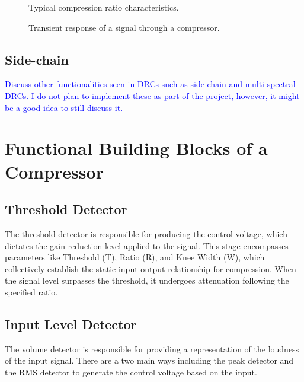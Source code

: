 \documentclass[10pt]{article}
\begin{document}
\begin{multicols*}{2}
            \begin{figure*}[ht]
                \centering
                \begin{minipage}{0.5\linewidth}
                    \centering
                    
                    \caption{Typical compression ratio characteristics.}
                    \label{fig:comp-ratio}
                \end{minipage}\hfill
                \begin{minipage}{0.5\linewidth}
                    \centering
                    
                    \caption{Transient response of a signal through a compressor.}
                    \label{fig:comp-trans}
                \end{minipage}\hfill
            \end{figure*}

            \subsection{Side-chain}
                \textcolor{blue}{Discuss other functionalities seen in DRCs such as side-chain and multi-spectral DRCs. I do not plan to implement these as part of the project, however, it might be a good idea to still discuss it.}

        \section{Functional Building Blocks of a Compressor}

            \subsection{Threshold Detector}
                The threshold detector is responsible for producing the control voltage, which dictates the gain reduction level applied to the signal. This stage encompasses parameters like Threshold (T), Ratio (R), and Knee Width (W), which collectively establish the static input-output relationship for compression. When the signal level surpasses the threshold, it undergoes attenuation following the specified ratio.
            
            \subsection{Input Level Detector}
                The volume detector is responsible for providing a representation of the loudness of the input signal. There are a two main ways including the peak detector and the RMS detector to generate the control voltage based on the input.


\end{multicols*}
\end{document}
